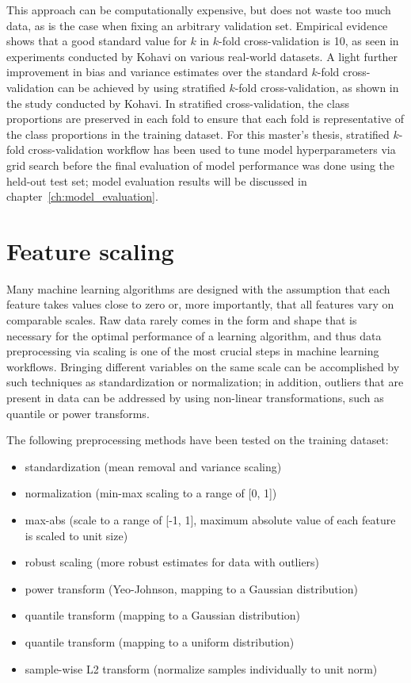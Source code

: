 This approach can be computationally expensive, but does not waste too much data, as is the case when fixing an arbitrary validation set.
Empirical evidence shows that a good standard value for $k$ in $k$-fold cross-validation is 10, as seen in experiments conducted by Kohavi on various real-world datasets\cite{Kohavi1995}.
A light further improvement in bias and variance estimates over the standard $k$-fold cross-validation can be achieved by using stratified $k$-fold cross-validation, as shown in the study conducted by Kohavi.
In stratified cross-validation, the class proportions are preserved in each fold to ensure that each fold is representative of the class proportions in the training dataset.
For this master's thesis, stratified $k$-fold cross-validation workflow has been used to tune model hyperparameters via grid search before the final evaluation of model performance was done using the held-out test set;
model evaluation results will be discussed in chapter~\ref{ch:model_evaluation}.

\section{Feature scaling} \label{sec:feature_scaling}

Many machine learning algorithms are designed with the assumption that each feature takes values close to zero or, more importantly, that all features vary on comparable scales\cite{Scikit-learndevelopers2019b}.
Raw data rarely comes in the form and shape that is necessary for the optimal performance of a learning algorithm, and thus data preprocessing via scaling is one of the most crucial steps in machine learning workflows\cite{RaschkaMirjalili2017}.
Bringing different variables on the same scale can be accomplished by such techniques as standardization or normalization;
in addition, outliers that are present in data can be addressed by using non-linear transformations, such as quantile or power transforms.

\vspace{5mm}

The following preprocessing methods have been tested on the training dataset:

\begin{itemize}
    \item standardization (mean removal and variance scaling)
    \item normalization (min-max scaling to a range of [0, 1])
    \item max-abs (scale to a range of [-1, 1], maximum absolute value of each feature is scaled to unit size)
    \item robust scaling (more robust estimates for data with outliers)
    \item power transform (Yeo-Johnson, mapping to a Gaussian distribution)
    \item quantile transform (mapping to a Gaussian distribution)
    \item quantile transform (mapping to a uniform distribution)
    \item sample-wise L2 transform (normalize samples individually to unit norm)
\end{itemize}

